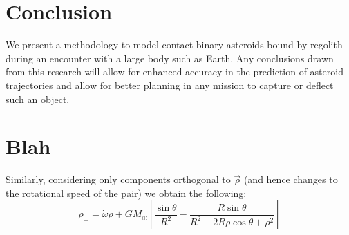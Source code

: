 \documentclass[letterpaper, preprint, paper,11pt]{AAS}	%
\begin{document}
\section{Conclusion}
We present a methodology to model contact binary asteroids bound by regolith during an encounter with a large body such as Earth. Any conclusions drawn from this research will allow for enhanced accuracy in the prediction of asteroid trajectories and allow for better planning in any mission to capture or deflect such an object.


\section{Blah}
Similarly, considering only components orthogonal to $\vec{\rho}$ (and hence changes to the rotational speed of the pair) we obtain the following:
\begin{equation}
\ddot{\rho}_\bot = \dot{\omega}\rho +  {GM_\oplus}\left[\frac{\sin\theta}{R^{2}}-\frac{R\sin\theta}{R^{2}+2R\rho\cos\theta+\rho^{2}}\right]
\end{equation}
\end{document}
